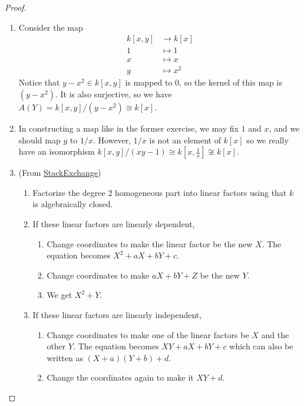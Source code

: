 \begin{proof}\leavevmode
	\begin{enumerate}[label=(\alph*)]
		\item Consider the map
		\begin{align*}
			k[x,y]&\to k[x]\\
			1&\mapsto1\\
			x&\mapsto x\\
			y&\mapsto x^2
		\end{align*}
		Notice that $y-x^2\in k[x,y]$ is mapped to $0$, so the kernel of this map is $(y-x^2)$. It is also surjective, so we have $A(Y)=k[x,y]/(y-x^2)\cong k[x]$.

	\item In constructing a map like in the former exercise, we may fix $1$ and $x$, and we should map $y$ to $1/x$. However, $1/x$ is not an element of $k[x]$ so we really have an isomorphism $k[x,y]/(xy-1)\cong k[x,\frac{1}{x}]\not\cong k[x]$.

		\item (From \href{https://math.stackexchange.com/questions/2412614/hartshorne-exercise-1-1-c}{StackExchange})
			\begin{enumerate}[label=\textbf{Step \arabic*}]
				\item Factorize the degree 2 homogeneous part into linear factors using that $k$ is algebraically closed.

				\item If these linear factors are linearly dependent,
					\begin{enumerate}
						\item Change coordinates to make the linear factor be the new $X$. The equation becomes $X^2+aX+bY+c$.
						\item Change coordinates to make $aX+bY+Z$ be the new $Y$.
						\item We get $X^2+Y$.
					\end{enumerate}

				\item If these linear factors are linearly independent,
					\begin{enumerate}
						\item Change coordinates to make one of the linear factors be $X$ and the other $Y$. The equation becomes $XY+aX+bY+c$ which can also be written as $(X+a)(Y+b)+d$.
						\item Change the coordinates again to make it $XY+d$.
					\end{enumerate}
			\end{enumerate}
	\end{enumerate}
\end{proof}

